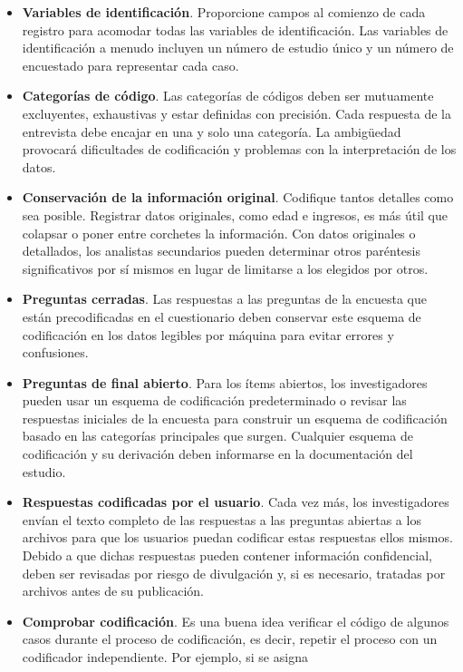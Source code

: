 \documentclass[
  spanish,
  letterpaper,
  DIV=11,
  numbers=noendperiod]{scrreprt}
\begin{document}
\begin{itemize}
\item
  \textbf{Variables de identificación}. Proporcione campos al comienzo
  de cada registro para acomodar todas las variables de identificación.
  Las variables de identificación a menudo incluyen un número de estudio
  único y un número de encuestado para representar cada caso.
\item
  \textbf{Categorías de código}. Las categorías de códigos deben ser
  mutuamente excluyentes, exhaustivas y estar definidas con precisión.
  Cada respuesta de la entrevista debe encajar en una y solo una
  categoría. La ambigüedad provocará dificultades de codificación y
  problemas con la interpretación de los datos.
\item
  \textbf{Conservación de la información original}. Codifique tantos
  detalles como sea posible. Registrar datos originales, como edad e
  ingresos, es más útil que colapsar o poner entre corchetes la
  información. Con datos originales o detallados, los analistas
  secundarios pueden determinar otros paréntesis significativos por sí
  mismos en lugar de limitarse a los elegidos por otros.
\item
  \textbf{Preguntas cerradas}. Las respuestas a las preguntas de la
  encuesta que están precodificadas en el cuestionario deben conservar
  este esquema de codificación en los datos legibles por máquina para
  evitar errores y confusiones.
\item
  \textbf{Preguntas de final abierto}. Para los ítems abiertos, los
  investigadores pueden usar un esquema de codificación predeterminado o
  revisar las respuestas iniciales de la encuesta para construir un
  esquema de codificación basado en las categorías principales que
  surgen. Cualquier esquema de codificación y su derivación deben
  informarse en la documentación del estudio.
\item
  \textbf{Respuestas codificadas por el usuario}. Cada vez más, los
  investigadores envían el texto completo de las respuestas a las
  preguntas abiertas a los archivos para que los usuarios puedan
  codificar estas respuestas ellos mismos. Debido a que dichas
  respuestas pueden contener información confidencial, deben ser
  revisadas por riesgo de divulgación y, si es necesario, tratadas por
  archivos antes de su publicación.
\item
  \textbf{Comprobar codificación}. Es una buena idea verificar el código
  de algunos casos durante el proceso de codificación, es decir, repetir
  el proceso con un codificador independiente. Por ejemplo, si se asigna

\end{itemize}
\end{document}
